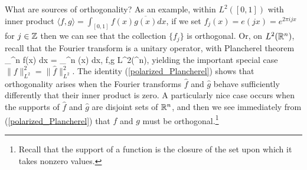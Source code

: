 \documentclass[brochure,english,12pt]{bourbaki}%
\begin{document}
  What are sources of orthogonality? As an example, within $L^2([0,1])$ with inner product $\langle f, g \rangle = \int_{[0,1]} f(x) \overline{g(x)}dx$, if we set $f_j(x) = e( jx) = e^{2\pi i j x}$ for $j \in \mathbb{Z}$ then we can see that the collection $\{f_j\}$ is orthogonal. Or, on $L^2 (\mathbb{R}^n)$, recall that the Fourier transform is a unitary operator, with  Plancherel theorem 
  \beq\label{polarized_Plancherel}
  \int_{\R^n} f(x) dx = \int_{\R^n} (x)  dx, \qquad f,g \in L^2(\R^n),
  \eeq
yielding the important  special case $\|f \|^2_{L^2}  = \| \hat{f} \|^2_{L^2}$.
The identity (\ref{polarized_Plancherel}) shows that orthogonality arises when the Fourier transforms $\hat{f}$ and $\hat{g}$ behave sufficiently differently that their inner product is zero. A particularly nice case occurs when the supports of $\hat{f}$ and $\hat{g}$ are disjoint sets of $\mathbb{R}^n$, and then we see immediately from (\ref{polarized_Plancherel}) that $f$ and $g$ must be orthogonal.\footnote{Recall that the support of a function is the closure of the set upon which it takes nonzero values.}
 
\end{document}
